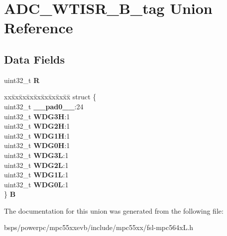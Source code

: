 \hypertarget{unionADC__WTISR__32B__tag}{}\section{A\+D\+C\+\_\+\+W\+T\+I\+S\+R\+\_\+B\+\_\+tag Union Reference}
\label{unionADC__WTISR__32B__tag}
\subsection*{Data Fields}
\begin{DoxyCompactItemize}
\item 
\mbox{\label{unionADC__WTISR__32B__tag_abc01b2343d254f584b98a873b8c8453f}} 
uint32\+\_\+t {\bfseries R}
\item 
\mbox{\label{unionADC__WTISR__32B__tag_a9cdfe078e96c11d771f191cef0bfbdc1}} 
\begin{tabbing}
xx\=xx\=xx\=xx\=xx\=xx\=xx\=xx\=xx\=\kill
struct \{\\
\>uint32\_t {\bfseries \_\_pad0\_\_}:24\\
\>uint32\_t {\bfseries WDG3H}:1\\
\>uint32\_t {\bfseries WDG2H}:1\\
\>uint32\_t {\bfseries WDG1H}:1\\
\>uint32\_t {\bfseries WDG0H}:1\\
\>uint32\_t {\bfseries WDG3L}:1\\
\>uint32\_t {\bfseries WDG2L}:1\\
\>uint32\_t {\bfseries WDG1L}:1\\
\>uint32\_t {\bfseries WDG0L}:1\\
\} {\bfseries B}\\

\end{tabbing}\end{DoxyCompactItemize}


The documentation for this union was generated from the following file\+:\begin{DoxyCompactItemize}
\item 
bsps/powerpc/mpc55xxevb/include/mpc55xx/fsl-\/mpc564x\+L.\+h\end{DoxyCompactItemize}
